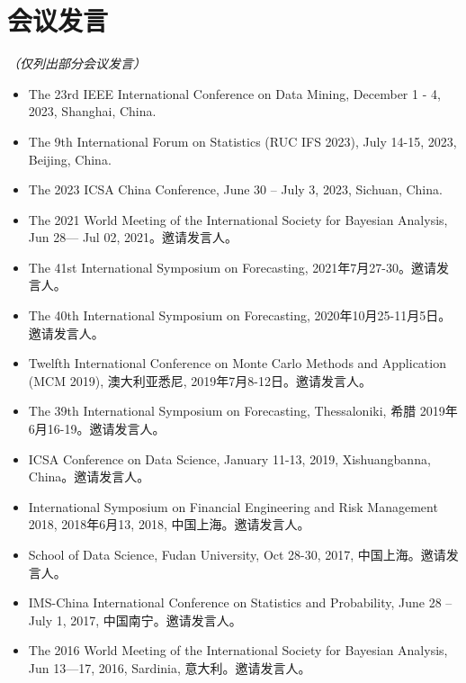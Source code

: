 \documentclass[twoside,a4paper,11pt]{article}
\begin{document}
\section*{会议发言}

\emph{（仅列出部分会议发言）}

\begin{itemize}

\item The 23rd IEEE International Conference on Data Mining, December 1 - 4, 2023, Shanghai, China.

\item The 9th International Forum on Statistics (RUC IFS 2023), July 14-15, 2023, Beijing, China.

\item The 2023 ICSA China Conference, June 30 – July 3, 2023, Sichuan, China.

\item The 2021 World Meeting of the International Society for Bayesian Analysis, Jun
  28— Jul 02, 2021。邀请发言人。

\item The 41st International Symposium on Forecasting, 2021年7月27-30。邀请发言人。

\item The 40th International Symposium on Forecasting,  2020年10月25-11月5日。邀请发言人。

\item Twelfth International Conference on Monte Carlo Methods and Application (MCM 2019),
  澳大利亚悉尼, 2019年7月8-12日。邀请发言人。

\item The 39th International Symposium on Forecasting, Thessaloniki, 希腊 2019年6月16-19。邀请发言人。

\item ICSA Conference on Data Science, January 11-13, 2019, Xishuangbanna, China。邀请发言人。

\item International Symposium on Financial Engineering and Risk Management 2018, 2018年6月13,
  2018, 中国上海。邀请发言人。

\item School of Data Science, Fudan University, Oct 28-30, 2017, 中国上海。邀请发言人。

\item IMS-China International Conference on Statistics and Probability, June 28 – July 1,
  2017, 中国南宁。邀请发言人。


\item The 2016 World Meeting of the International Society for Bayesian Analysis, Jun
  13—17, 2016, Sardinia, 意大利。邀请发言人。


\end{itemize}
\end{document}
